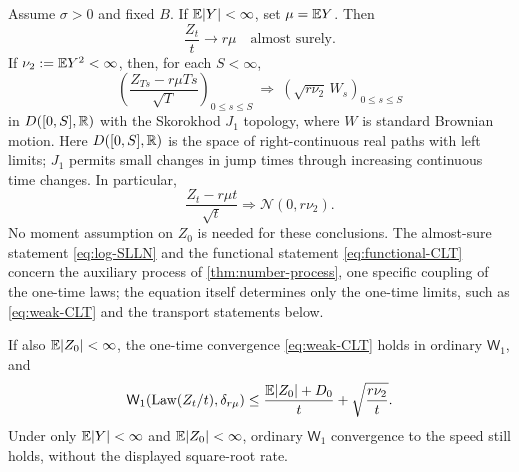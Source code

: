 \begin{theorem}
\label{thm:log-limits}
Assume $\sigma>0$ and fixed $B$.
If $\mathbb E|Y|<\infty$, set $\mu=\mathbb E Y$. Then
\begin{equation}
 \frac{Z_t}{t}\longrightarrow r\mu
             \quad\text{almost surely}.
 \label{eq:log-SLLN}
\end{equation}
If $\nu_2:=\mathbb E Y^2<\infty$, then, for each $S<\infty$,
\begin{equation}
 \left(\frac{Z_{Ts}-r\mu Ts}{\sqrt T}\right)_{0\leq s\leq S}
 \ \Longrightarrow\
 \left(\sqrt{r\nu_2}\,W_s\right)_{0\leq s\leq S}
 \label{eq:functional-CLT}
\end{equation}
in $D([0,S],\mathbb R)$ with the Skorokhod $J_1$ topology, where $W$ is
standard Brownian motion. Here $D([0,S],\mathbb R)$ is the space of
right-continuous real paths with left limits; $J_1$ permits small
changes in jump times through increasing continuous time changes.
In particular,
\begin{equation}
 \frac{Z_t-r\mu t}{\sqrt t}
          \Longrightarrow\mathcal N(0,r\nu_2).
 \label{eq:weak-CLT}
\end{equation}
No moment assumption on $Z_0$ is needed for these conclusions.
The almost-sure statement \eqref{eq:log-SLLN} and the functional
statement \eqref{eq:functional-CLT} concern the auxiliary process of
\cref{thm:number-process}, one specific coupling of the one-time
laws; the equation itself determines only the one-time limits, such
as \eqref{eq:weak-CLT} and the transport statements below.

If also $\mathbb E|Z_0|<\infty$, the one-time convergence
\eqref{eq:weak-CLT} holds in ordinary $\mathsf W_1$, and
\begin{equation}
 \mathsf W_1(\operatorname{Law}(Z_t/t),\delta_{r\mu})
 \leq\frac{\mathbb E|Z_0|+D_0}{t}+\sqrt{\frac{r\nu_2}{t}}.
 \label{eq:W1-speed-bound}
\end{equation}
Under only $\mathbb E|Y|<\infty$ and $\mathbb E|Z_0|<\infty$, ordinary
$\mathsf W_1$ convergence to the speed still holds, without the
displayed square-root rate.
\end{theorem}

